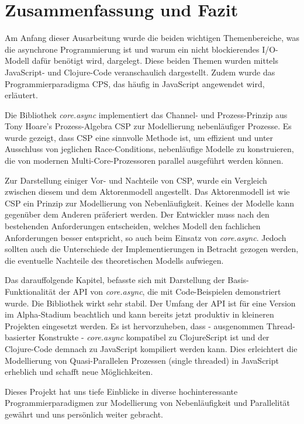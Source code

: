 \chapter{Zusammenfassung und Fazit}

Am Anfang dieser Ausarbeitung wurde die beiden wichtigen Themenbereiche, was die asynchrone Programmierung ist und warum ein nicht blockierendes \acs{I/O}-Modell dafür benötigt wird, dargelegt.
Diese beiden Themen wurden mittels JavaScript- und Clojure-Code veranschaulich dargestellt. Zudem wurde das Programmierparadigma \acf{CPS}, das häufig in JavaScript angewendet wird, erläutert.

Die Bibliothek \textit{core.async} implementiert das Channel- und Prozess-Prinzip aus Tony Hoare's Prozess-Algebra \acf{CSP} zur Modellierung nebenläufiger Prozesse. Es wurde gezeigt, dass \acs{CSP} eine sinnvolle Methode ist, um effizient und unter Ausschluss von jeglichen Race-Conditions, nebenläufige Modelle zu konstruieren, die von modernen Multi-Core-Prozessoren parallel ausgeführt werden können.

Zur Darstellung einiger Vor- und Nachteile von \acs{CSP}, wurde ein Vergleich zwischen diesem und dem Aktorenmodell angestellt. Das Aktorenmodell ist wie \acs{CSP} ein Prinzip zur Modellierung von Nebenläufigkeit. Keines der Modelle kann gegenüber dem Anderen präferiert werden. Der Entwickler muss nach den bestehenden Anforderungen entscheiden, welches Modell den fachlichen Anforderungen besser entspricht, so auch beim Einsatz von \textit{core.async}. Jedoch sollten auch die Unterschiede der Implementierungen in Betracht gezogen werden, die eventuelle Nachteile des theoretischen Modells aufwiegen.

Das darauffolgende Kapitel, befasste sich mit Darstellung der Basis-Funktionalität der \acs{API} von \textit{core.async}, die mit Code-Beispielen demonstriert wurde. Die Bibliothek wirkt sehr stabil. Der Umfang der \acs{API} ist für eine Version im Alpha-Stadium beachtlich und kann bereits jetzt produktiv in kleineren Projekten eingesetzt werden. Es ist hervorzuheben, dass - ausgenommen Thread-basierter Konstrukte - \textit{core.async} kompatibel zu ClojureScript ist und der Clojure-Code demnach zu JavaScript kompiliert werden kann. Dies erleichtert die Modellierung von Quasi-Parallelen Prozessen (single threaded) in JavaScript erheblich und schafft neue Möglichkeiten.

Dieses Projekt hat uns tiefe Einblicke in diverse hochinteressante Programmierparadigmen zur Modellierung von Nebenläufigkeit und Parallelität gewährt und uns persönlich weiter gebracht.


